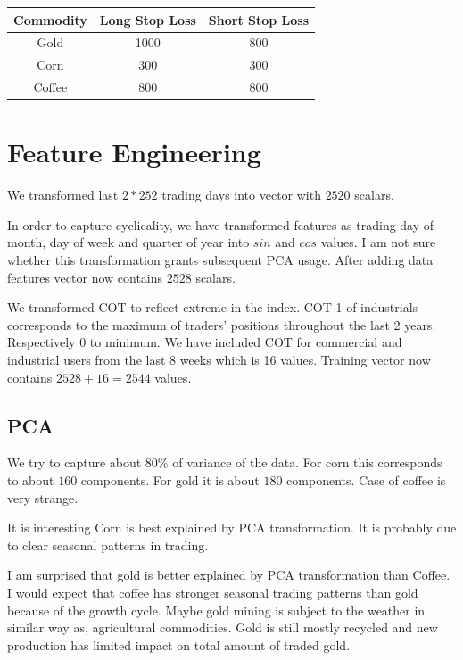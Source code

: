 \documentclass[final,2p]{elsarticle}
\begin{document}
\begin{center}
\begin{tabular}{|c|c|c|}
    \hline
    Commodity & Long Stop Loss & Short Stop Loss \\
    \hline
    Gold & 1000 & 800 \\
    Corn & 300 & 300 \\
    Coffee & 800 & 800 \\
    \hline
\end{tabular}
\end{center}

\clearpage

\section{Feature Engineering}

We transformed last $2*252$ trading days into vector with $2520$ scalars.

In order to capture cyclicality, we have transformed features as trading day of month, day of week and quarter of year into $sin$ and $cos$ values.
I am not sure whether this transformation grants subsequent PCA usage.
After adding data features vector now contains $2528$ scalars.

We transformed COT to reflect extreme in the index. COT 1 of industrials corresponds to the maximum of traders' positions throughout the last 2 years.
Respectively 0 to minimum. We have included COT for commercial and industrial users from the last 8 weeks which is 16 values.
Training vector now contains $2528+16=2544$ values.

\subsection{PCA}
We try to capture about 80\% of variance of the data. For corn this corresponds to about $160$ components. For gold it is about $180$ components.
Case of coffee is very strange.

It is interesting Corn is best explained by PCA transformation. It is probably due to clear seasonal patterns in trading.

I am surprised that gold is better explained by PCA transformation than Coffee. I would expect that coffee has stronger seasonal trading patterns than gold because of the growth cycle. Maybe gold mining is subject to the weather in similar way as, agricultural commodities. Gold is still mostly recycled and new production has limited impact on total amount of traded gold.
\end{document}
